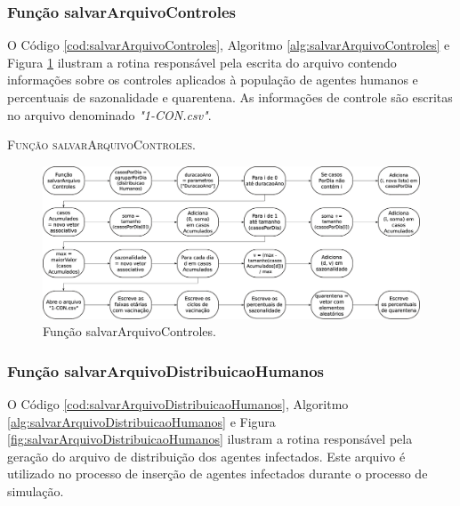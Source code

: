 \newpage

\subsubsection{Função salvarArquivoControles}

O Código \ref{cod:salvarArquivoControles}, Algoritmo \ref{alg:salvarArquivoControles} e Figura \ref{fig:salvarArquivoControles} ilustram a rotina responsável pela escrita do arquivo contendo informações sobre os controles aplicados à população de agentes humanos e percentuais de sazonalidade e quarentena. As informações de controle são escritas no arquivo denominado \textit{"1-CON.csv"}. 



\begin{algorithm}[H]
   \SetAlgoLined   
   
   \caption{\textsc{Função salvarArquivoControles.}}
   \label{alg:salvarArquivoControles}
\end{algorithm}

\begin{figure}[H]
  \centering
  \includegraphics[width=1\textwidth]{Figuras/Simula/Fluxos/salvarArquivoControles.eps}
  \caption{Função salvarArquivoControles.}
  \label{fig:salvarArquivoControles}
\end{figure} 

\newpage

\subsubsection{Função salvarArquivoDistribuicaoHumanos}

O Código \ref{cod:salvarArquivoDistribuicaoHumanos}, Algoritmo \ref{alg:salvarArquivoDistribuicaoHumanos} e Figura \ref{fig:salvarArquivoDistribuicaoHumanos} ilustram a rotina responsável pela geração do arquivo de distribuição dos agentes infectados. Este arquivo é utilizado no processo de inserção de agentes infectados durante o processo de simulação. 

